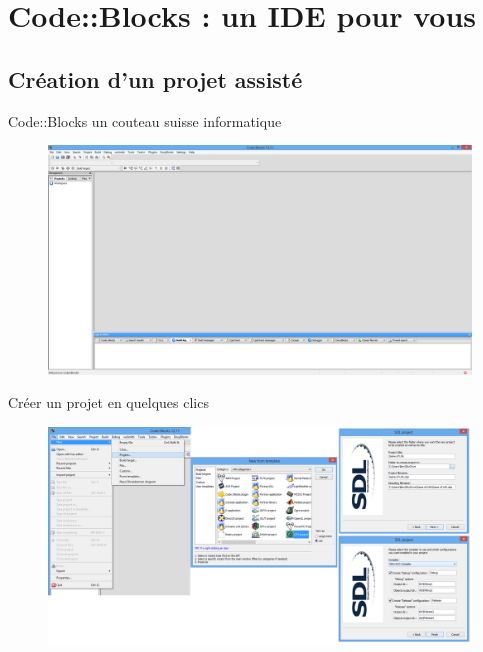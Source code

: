 \documentclass{beamer}
\begin{document}
\section{Code::Blocks : un IDE pour vous}

\subsection{Création d'un projet assisté}

\begin{frame}{Code::Blocks un couteau suisse informatique}
\begin{figure}
\includegraphics[scale=0.21]{../images/cb01.png}
\label{cb01}				
\end{figure}
\end{frame}

\begin{frame}{Créer un projet en quelques clics}
\begin{figure}
\includegraphics[scale=0.24]{../images/cb02.png}
\label{cb02}				
\end{figure}
\end{frame}
\end{document}
